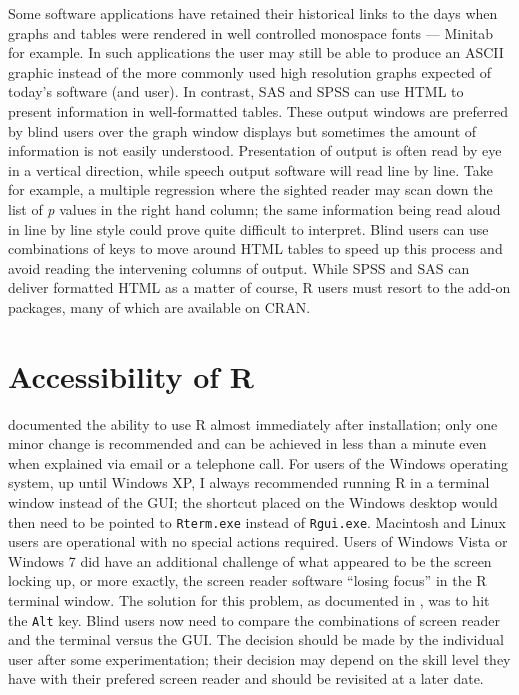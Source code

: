 \documentclass[
]{book}
\begin{document}
Some software applications have retained their historical links to the days when graphs and tables were rendered in well controlled monospace fonts --- Minitab for example. In such applications the user may still be able to produce an ASCII graphic instead of the more commonly used high resolution graphs expected of today's software (and user). In contrast, SAS and SPSS can use HTML to present information in well-formatted tables. These output windows are preferred by blind users over the graph window displays but sometimes the amount of information is not easily understood. Presentation of output is often read by eye in a vertical direction, while speech output software will read line by line. Take for example, a multiple regression where the sighted reader may scan down the list of \emph{p} values in the right hand column; the same information being read aloud in line by line style could prove quite difficult to interpret. Blind users can use combinations of keys to move around HTML tables to speed up this process and avoid reading the intervening columns of output. While SPSS and SAS can deliver formatted HTML as a matter of course, R users must resort to the add-on packages, many of which are available on CRAN.

\hypertarget{accessibility-of-r}{%
\section{Accessibility of R}\label{accessibility-of-r}}

\citep{GodfreyRJournal} documented the ability to use R almost immediately after installation; only one minor change is recommended and can be achieved in less than a minute even when explained via email or a telephone call. For users of the Windows operating system, up until Windows XP, I always recommended running R in a terminal window instead of the GUI; the shortcut placed on the Windows desktop would then need to be pointed to \texttt{Rterm.exe} instead of \texttt{Rgui.exe}.
Macintosh and Linux users are operational with no special actions required.
Users of Windows Vista or Windows 7 did have an additional challenge of what appeared to be the screen locking up, or more exactly, the screen reader software ``losing focus'' in the R terminal window. The solution for this problem, as documented in \citep{GodfreyErhardtRJournalAddendum}, was to hit the \texttt{Alt} key.
Blind users now need to compare the combinations of screen reader and the terminal versus the GUI.
The decision should be made by the individual user after some experimentation; their decision may depend on the skill level they have with their prefered screen reader and should be revisited at a later date.
\end{document}
